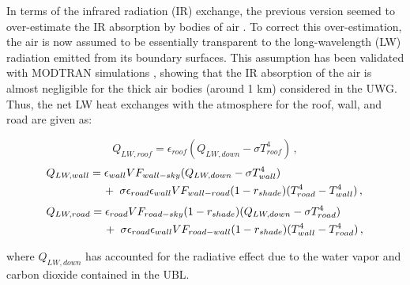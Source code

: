 \vspace{9pt}
In terms of the infrared radiation (IR) exchange, the previous version seemed to over-estimate the IR absorption by bodies of air \cite{fenn1985optical}. To correct this over-estimation, the air is now assumed to be essentially transparent to the long-wavelength (LW) radiation emitted from its boundary surfaces. This assumption has been validated with MODTRAN simulations \cite{yang2016curious}, showing that the IR absorption of the air is almost negligible for the thick air bodies (around 1 km) considered in the UWG. Thus, the net LW heat exchanges with the atmosphere for the roof, wall, and road are given as:

\begin{equation}
Q_{LW,roof} = \epsilon_{roof} (Q_{LW,down} - \sigma T^4_{roof})\,,
\end{equation}
\vspace{-1em}
\begin{equation}
\begin{split}
\hspace{-1.5pt} Q_{LW,wall} & = \epsilon_{wall} VF_{wall-sky} (Q_{LW,down} - \sigma T^4_{wall}) \\
& \hspace{12pt}+\hspace{3pt} \sigma \epsilon_{road} \epsilon_{wall} VF_{wall-road} (1 - r_{shade}) (T^4_{road} - T^4_{wall})\,,
\end{split}
\end{equation}
\vspace{-0.25em}
\begin{equation}
\begin{split}
\hspace{-1.5pt} Q_{LW,road} & = \epsilon_{road} VF_{road-sky} (1 - r_{shade}) (Q_{LW,down} - \sigma T^4_{road}) \\
& \hspace{12pt}+\hspace{3pt} \sigma \epsilon_{road} \epsilon_{wall} VF_{road-wall} (1 - r_{shade}) (T^4_{wall} - T^4_{road})\,,
\end{split}
\end{equation}

\vspace{21pt}
\noindent where $Q_{LW,down}$ has accounted for the radiative effect due to the water vapor and carbon dioxide contained in the UBL.

